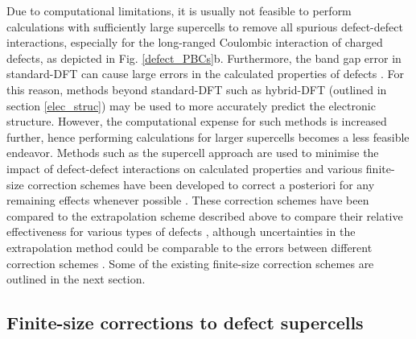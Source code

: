 \documentclass[11pt, twoside]{report}
\begin{document}
Due to computational limitations, it is usually not feasible to perform calculations with sufficiently large supercells to remove all spurious defect-defect interactions, especially for the long-ranged Coulombic interaction of charged defects, as depicted in Fig. \ref{defect_PBCs}b.
Furthermore, the band gap error in standard-DFT can cause large errors in the calculated properties of defects \cite{Lany_defects}. For this reason, methods beyond standard-DFT such as hybrid-DFT (outlined in section \ref{elec_struc}) may be used to more accurately predict the electronic structure. However, the computational expense for such methods is increased further, hence performing calculations for larger supercells becomes a less feasible endeavor.
Methods such as the supercell approach are used to minimise the impact of defect-defect interactions on calculated properties and various finite-size correction schemes have been developed to correct a posteriori for any remaining effects whenever possible \cite{freysoldt_rev}. These correction schemes have been compared to the extrapolation scheme described above to compare their relative effectiveness for various types of defects \cite{komsa}, although uncertainties in the extrapolation method could be comparable to the errors between different correction schemes \cite{Durrant_defects}. Some of the existing finite-size correction schemes are outlined in the next section. 

\subsection{Finite-size corrections to defect supercells}
\end{document}
